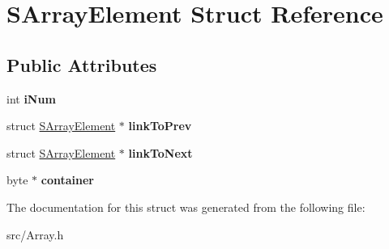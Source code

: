\hypertarget{struct_s_array_element}{}\section{S\+Array\+Element Struct Reference}
\label{struct_s_array_element}
\subsection*{Public Attributes}
\begin{DoxyCompactItemize}
\item 
\mbox{\label{struct_s_array_element_a59cc074b7bda92f65b97b5cb9dddec5e}} 
int {\bfseries i\+Num}
\item 
\mbox{\label{struct_s_array_element_a3bfdbcb5a8d34670a0a67e3e91c0646f}} 
struct \hyperlink{struct_s_array_element}{S\+Array\+Element} $\ast$ {\bfseries link\+To\+Prev}
\item 
\mbox{\label{struct_s_array_element_a1ca4331e530d168177a231b87f3c39af}} 
struct \hyperlink{struct_s_array_element}{S\+Array\+Element} $\ast$ {\bfseries link\+To\+Next}
\item 
\mbox{\label{struct_s_array_element_a87d624c24901312ce8ade3523252f237}} 
byte $\ast$ {\bfseries container}
\end{DoxyCompactItemize}


The documentation for this struct was generated from the following file\+:\begin{DoxyCompactItemize}
\item 
src/Array.\+h\end{DoxyCompactItemize}
